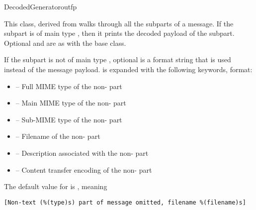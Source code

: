 \begin{classdesc}{DecodedGenerator}{outfp}

This class, derived from  walks through all the
subparts of a message.  If the subpart is of main type
, then it prints the decoded payload of the subpart.
Optional  and  are as with the
 base class.

If the subpart is not of main type , optional 
is a format string that is used instead of the message payload.
 is expanded with the following keywords, 
format:

\begin{itemize}
\item {} -- Full MIME type of the non- part

\item {} -- Main MIME type of the non- part

\item {} -- Sub-MIME type of the non- part

\item {} -- Filename of the non- part

\item {} -- Description associated with the
      non- part

\item {} -- Content transfer encoding of the
      non- part

\end{itemize}

The default value for  is , meaning

\begin{verbatim}
[Non-text (%(type)s) part of message omitted, filename %(filename)s]
\end{verbatim}

\end{classdesc}

